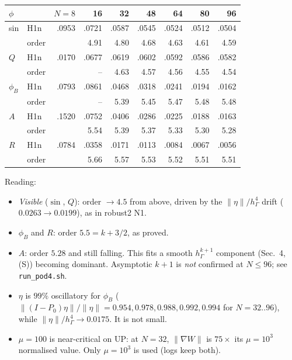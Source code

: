 \documentclass[11pt]{article}
\theoremstyle{remark}
\newcommand{\hG}{h_\Gamma}
\begin{document}
\begin{center}\small
\begin{tabular}{llrrrrrrr}\toprule
$\phi$ & & $N=8$ & 16 & 32 & 48 & 64 & 80 & 96\\\midrule
sin & H1n & .0953 & .0721 & .0587 & .0545 & .0524 & .0512 & .0504\\
    & order & & 4.91 & 4.80 & 4.68 & 4.63 & 4.61 & 4.59\\
$Q$ & H1n & .0170 & .0677 & .0619 & .0602 & .0592 & .0586 & .0582\\
    & order & & -- & 4.63 & 4.57 & 4.56 & 4.55 & 4.54\\
$\phi_B$ & H1n & .0793 & .0861 & .0468 & .0318 & .0241 & .0194 & .0162\\
    & order & & -- & 5.39 & 5.45 & 5.47 & 5.48 & 5.48\\
$A$ & H1n & .1520 & .0752 & .0406 & .0286 & .0225 & .0188 & .0163\\
    & order & & 5.54 & 5.39 & 5.37 & 5.33 & 5.30 & 5.28\\
$R$ & H1n & .0784 & .0358 & .0171 & .0113 & .0084 & .0067 & .0056\\
    & order & & 5.66 & 5.57 & 5.53 & 5.52 & 5.51 & 5.51\\\bottomrule
\end{tabular}
\end{center}
Reading:
\begin{itemize}
\item \emph{Visible} ($\sin$, $Q$): order $\to4.5$ from above, driven by the $\|\eta\|/\hG^4$ drift ($0.0263\to0.0199$), as in
robust2 N1.
\item $\phi_B$ and $R$: order $5.5=k+3/2$, as proved.
\item $A$: order $5.28$ and still falling. This fits a smooth $\hG^{k+1}$ component (Sec.~4, (S)) becoming dominant.
Asymptotic $k+1$ is \emph{not} confirmed at $N\le96$; see \texttt{run\_pod4.sh}.
\item $\eta$ is $99\%$ oscillatory for $\phi_B$ ($\|(I-P_0)\eta\|/\|\eta\|=0.954,0.978,0.988,0.992,0.994$ for $N=32..96$), while
$\|\eta\|/\hG^4\to0.0175$. It is not small.
\item $\mu=100$ is near-critical on \textsf{UP}: at $N=32$, $\|\nabla W\|$ is $75\times$ its $\mu=10^3$ normalised value. Only
$\mu=10^3$ is used (logs keep both).
\end{itemize}
\end{document}
